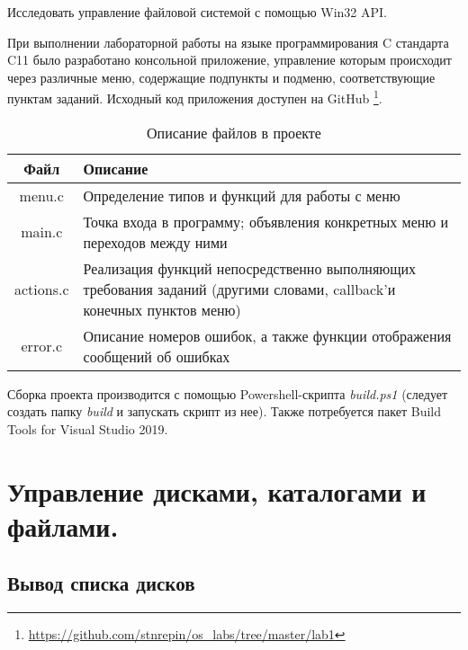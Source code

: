 \documentclass[a4paper,14pt]{extarticle}
\newcommand{\Code}[1]{\textit{#1}}
\begin{document}


\renewcommand*{\thepage}{}
\tableofcontents
\clearpage
\renewcommand*{\thepage}{\arabic{page}}

\setcounter{page}{3}


Исследовать управление файловой системой с помощью Win32 API.


При выполнении лабораторной работы на языке программирования C стандарта C11
было разработано консольной приложение, управление которым происходит через
различные меню, содержащие подпункты и подменю, соответствующие пунктам
заданий. Исходный код приложения доступен на GitHub
\footnote{\url{https://github.com/stnrepin/os_labs/tree/master/lab1}}.

\begin{table}[H]
    \centering
    \caption{Описание файлов в проекте}
    \begin{tabularx}{\textwidth}{|c|X|}
        \hline
        Файл & Описание \\
        \hline
        menu.c & Определение типов и функций для работы с меню \\
        \hline
        main.c & Точка входа в программу; объявления конкретных меню и
                    переходов между ними \\
        \hline
        actions.c & Реализация функций непосредственно выполняющих требования
                    заданий (другими словами, callback'и конечных пунктов меню)
                    \\
        \hline
        error.c & Описание номеров ошибок, а также функции отображения
                    сообщений об ошибках \\
        \hline
    \end{tabularx}
\end{table}

Сборка проекта производится с помощью Powershell-скрипта \Code{build.ps1}
(следует создать папку \Code{build} и запускать скрипт из нее). Также
потребуется пакет Build Tools for Visual Studio 2019.


\clearpage

\section{Управление дисками, каталогами и файлами.}


\subsection{Вывод списка дисков}
\end{document}
